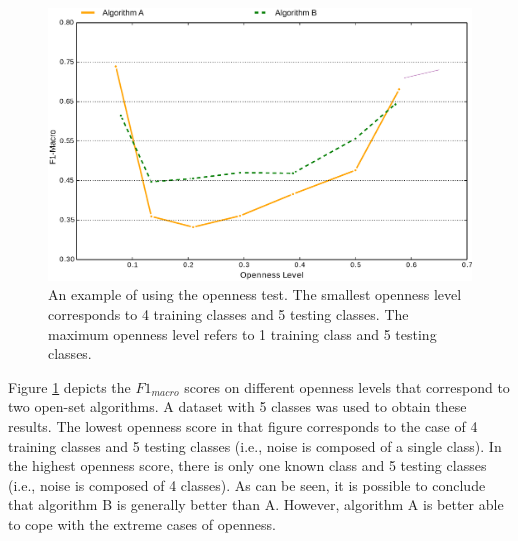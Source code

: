 \begin{figure}[t]
	\begin{center}
    	\includegraphics[scale=0.50]{Figures/openness_test_for_f1_scores_example.eps}
		\caption{An example of using the openness test. The smallest openness level corresponds to 4 training classes and 5 testing classes. The maximum openness level refers to 1 training class and 5 testing classes.}
		\label{chap:eval_methods:fig:openness}
	\end{center}
\end{figure}


Figure \ref{chap:eval_methods:fig:openness} depicts the $F1_{macro}$ scores on different openness levels that correspond to two open-set algorithms. A dataset with 5 classes was used to obtain these results. The lowest openness score in that figure corresponds to the case of 4 training classes and 5 testing classes (i.e., noise is composed of a single class). In the highest openness score, there is only one known class and 5 testing classes (i.e., noise is composed of 4 classes). As can be seen, it is possible to conclude that algorithm B is generally better than A. However, algorithm A is better able to cope with the extreme cases of openness.
 



